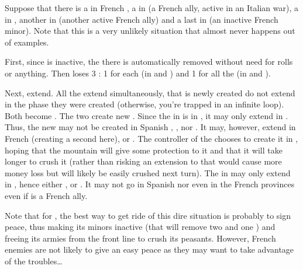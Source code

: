 \begin{exemple}
  Suppose that there is a \REVOLT\Faceplus in French \provinceBearn, a
  \REVOLT\Faceplus in \provinceSavoia (a French ally, active in an Italian
  war), a \REVOLT\Facemoins in \provinceBerry, another in \provincePfalz
  (another active French ally) and a last \REVOLT\Faceplus in
  \provinceLorraine (an inactive French minor). Note that this is a very
  unlikely situation that almost never happens out of examples.

  First, since \paysLorraine is inactive, the \REVOLT there is automatically
  removed without need for rolls or anything. Then \FRA loses 3 \STAB: 1 for
  each \REVOLT\Faceplus (in \provinceBearn and \provinceSavoia) and 1 for all
  the \REVOLT\Facemoins (in \provinceBerry and \provincePfalz).

  Next, \REVOLT extend. All the \REVOLT extend simultaneously, that is newly
  created \REVOLT do not extend in the phase they were created (otherwise,
  you're trapped in an infinite loop). Both \REVOLT\Facemoins become
  \REVOLT\Faceplus. The two \REVOLT\Faceplus create new
  \REVOLT\Facemoins. Since the \REVOLT\Faceplus in \provinceBearn is in \FRA,
  it may only extend in \FRA. Thus, the new \REVOLT\Facemoins may not be
  created in Spanish \provinceVizcaya, \provinceNavarra, \provincePirineos nor
  \provinceRosselo. It may, however, extend in French \provinceBearn (creating
  a second \REVOLT here), \provinceGuyenne or \provinceLanguedoc. The
  controller of the \REVOLT chooses to create it in \provinceBearn, hoping
  that the mountain will give some protection to it and that it will take
  longer to crush it (rather than risking an extension to \provinceLanguedoc
  that would cause more money loss but will likely be easily crushed next
  turn). The \REVOLT\Faceplus in \provinceSavoia may only extend in
  \paysSavoie, hence either \provinceSavoia, \provinceBresse or
  \provinceNice. It may not go in Spanish \provinceLombardia nor even in the
  French provinces even if \paysSavoie is a French ally.

  \smallskip

  Note that for \FRA, the best way to get ride of this dire situation is
  probably to sign peace, thus making its minors inactive (that will remove
  two \REVOLT\Faceplus and one \REVOLT\Facemoins) and freeing its armies from
  the front line to crush its peasants. However, French enemies are not likely
  to give an easy peace as they may want to take advantage of the
  troubles\ldots
\end{exemple}

